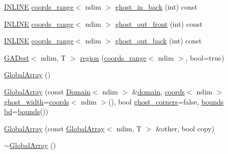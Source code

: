 \begin{DoxyCompactItemize}
\hyperlink{common_8hpp_a2eb6f9e0395b47b8d5e3eeae4fe0c116}{I\+N\+L\+I\+NE} \hyperlink{structshark_1_1ndim_1_1coords__range}{coords\+\_\+range}$<$ ndim $>$ \hyperlink{classshark_1_1ndim_1_1_global_array_a55074d9d00de584f5817668e0c69f58a}{ghost\+\_\+in\+\_\+back} (int) const
\item 
\hyperlink{common_8hpp_a2eb6f9e0395b47b8d5e3eeae4fe0c116}{I\+N\+L\+I\+NE} \hyperlink{structshark_1_1ndim_1_1coords__range}{coords\+\_\+range}$<$ ndim $>$ \hyperlink{classshark_1_1ndim_1_1_global_array_ad004cd3a0deeaee55d7f3590063d5a20}{ghost\+\_\+out\+\_\+front} (int) const
\item 
\hyperlink{common_8hpp_a2eb6f9e0395b47b8d5e3eeae4fe0c116}{I\+N\+L\+I\+NE} \hyperlink{structshark_1_1ndim_1_1coords__range}{coords\+\_\+range}$<$ ndim $>$ \hyperlink{classshark_1_1ndim_1_1_global_array_ae4618013580af820c76c7e48d6de874a}{ghost\+\_\+out\+\_\+back} (int) const
\item 
\hyperlink{classshark_1_1ndim_1_1_g_a_dest}{G\+A\+Dest}$<$ ndim, T $>$ \hyperlink{classshark_1_1ndim_1_1_global_array_aab2d58e37ec78fd0aca6a6366e9b7aac}{region} (\hyperlink{structshark_1_1ndim_1_1coords__range}{coords\+\_\+range}$<$ ndim $>$, bool=true)
\item 
\hyperlink{classshark_1_1ndim_1_1_global_array_a5ab08686e28785763adac3fa73673f84}{Global\+Array} ()
\item 
\hyperlink{classshark_1_1ndim_1_1_global_array_aa1fb3bab347e8bc9c1347f46c2e3e4dd}{Global\+Array} (const \hyperlink{classshark_1_1ndim_1_1_domain}{Domain}$<$ ndim $>$ \&\hyperlink{classshark_1_1ndim_1_1_global_array_a435ee8ff23c3feadf2ef2be64d4f375c}{domain}, \hyperlink{structshark_1_1ndim_1_1coords}{coords}$<$ ndim $>$ \hyperlink{classshark_1_1ndim_1_1_global_array_a5331f21887f3c14791b758e99656a676}{ghost\+\_\+width}=\hyperlink{structshark_1_1ndim_1_1coords}{coords}$<$ ndim $>$(), bool \hyperlink{classshark_1_1ndim_1_1_global_array_abf0c9312657087578f89e1279ee6c451}{ghost\+\_\+corners}=false, \hyperlink{classshark_1_1ndim_1_1_global_array_a5376df376a8de6a0a756def884c55864}{bounds} \hyperlink{classshark_1_1ndim_1_1_global_array_aead89700a3d1d960432c6dc971251a9c}{bd}=\hyperlink{classshark_1_1ndim_1_1_global_array_a5376df376a8de6a0a756def884c55864}{bounds}())
\item 
\hyperlink{classshark_1_1ndim_1_1_global_array_a97e27f44095bf15566679fbb45377e2f}{Global\+Array} (const \hyperlink{classshark_1_1ndim_1_1_global_array}{Global\+Array}$<$ ndim, T $>$ \&other, bool copy)
\item 
\hyperlink{classshark_1_1ndim_1_1_global_array_acd71722990795db5e20aefc9e5545add}{$\sim$\+Global\+Array} ()

\end{DoxyCompactItemize}
